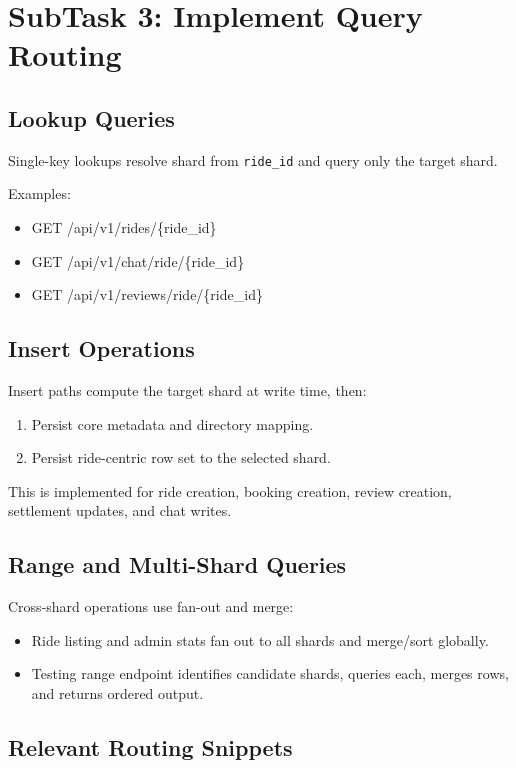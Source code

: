 \documentclass[12pt]{article}
\begin{document}
\section{SubTask 3: Implement Query Routing}

\subsection{Lookup Queries}

Single-key lookups resolve shard from \texttt{ride\_id} and query only the target shard.

Examples:
\begin{itemize}
    \item GET /api/v1/rides/\{ride\_id\}
    \item GET /api/v1/chat/ride/\{ride\_id\}
    \item GET /api/v1/reviews/ride/\{ride\_id\}
\end{itemize}

\subsection{Insert Operations}

Insert paths compute the target shard at write time, then:
\begin{enumerate}
    \item Persist core metadata and directory mapping.
    \item Persist ride-centric row set to the selected shard.
\end{enumerate}

This is implemented for ride creation, booking creation, review creation, settlement updates, and chat writes.

\subsection{Range and Multi-Shard Queries}

Cross-shard operations use fan-out and merge:
\begin{itemize}
    \item Ride listing and admin stats fan out to all shards and merge/sort globally.
    \item Testing range endpoint identifies candidate shards, queries each, merges rows, and returns ordered output.
\end{itemize}

\subsection{Relevant Routing Snippets}
\end{document}
